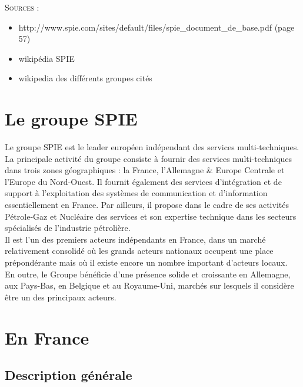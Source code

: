 \begin{shaded}
    \textsc{Sources} :
    \begin{itemize}
        \item[\textbullet] http://www.spie.com/sites/default/files/spie\_document\_de\_base.pdf (page 57)
        \item[\textbullet] wikipédia SPIE
        \item[\textbullet] wikipedia des différents groupes cités
    \end{itemize}
\end{shaded}

\section{Le groupe SPIE}

Le groupe SPIE est le leader européen indépendant des services multi-techniques. \\

La principale activité du groupe consiste à fournir des services multi-techniques dans trois zones géographiques : la France, l’Allemagne \& Europe Centrale et l’Europe du Nord-Ouest. Il fournit également des services d’intégration et de support à l’exploitation des systèmes de communication et d’information essentiellement en France. Par ailleurs, il propose dans le cadre de ses activités Pétrole-Gaz et Nucléaire des services et son expertise technique dans les secteurs spécialisés de l’industrie pétrolière. \\

Il est l’un des premiers acteurs indépendants en France, dans un marché relativement consolidé où les grands acteurs nationaux occupent une place prépondérante mais où il existe encore un nombre important d’acteurs locaux. \\ 

En outre, le Groupe bénéficie d’une présence solide et croissante en Allemagne, aux Pays-Bas, en Belgique et au Royaume-Uni, marchés sur lesquels il considère être un des principaux acteurs.

\section{En France}

\subsection{Description générale}

